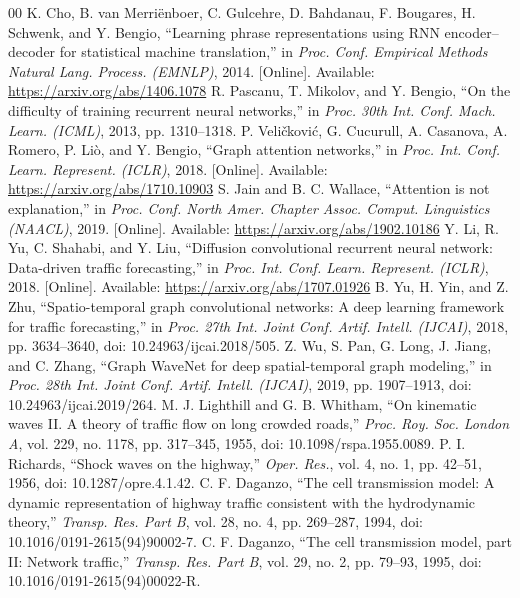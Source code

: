 \documentclass[conference]{IEEEtran}
\begin{document}
\begin{thebibliography}{00}
 K. Cho, B. van Merri\"enboer, C. Gulcehre, D. Bahdanau, F. Bougares, H. Schwenk, and Y. Bengio, ``Learning phrase representations using RNN encoder--decoder for statistical machine translation,'' in \emph{Proc. Conf. Empirical Methods Natural Lang. Process. (EMNLP)}, 2014. [Online]. Available: \url{https://arxiv.org/abs/1406.1078}
 R. Pascanu, T. Mikolov, and Y. Bengio, ``On the difficulty of training recurrent neural networks,'' in \emph{Proc. 30th Int. Conf. Mach. Learn. (ICML)}, 2013, pp. 1310--1318.
 P. Veli\v{c}kovi\'c, G. Cucurull, A. Casanova, A. Romero, P. Li\`o, and Y. Bengio, ``Graph attention networks,'' in \emph{Proc. Int. Conf. Learn. Represent. (ICLR)}, 2018. [Online]. Available: \url{https://arxiv.org/abs/1710.10903}
 S. Jain and B. C. Wallace, ``Attention is not explanation,'' in \emph{Proc. Conf. North Amer. Chapter Assoc. Comput. Linguistics (NAACL)}, 2019. [Online]. Available: \url{https://arxiv.org/abs/1902.10186}
 Y. Li, R. Yu, C. Shahabi, and Y. Liu, ``Diffusion convolutional recurrent neural network: Data-driven traffic forecasting,'' in \emph{Proc. Int. Conf. Learn. Represent. (ICLR)}, 2018. [Online]. Available: \url{https://arxiv.org/abs/1707.01926}
 B. Yu, H. Yin, and Z. Zhu, ``Spatio-temporal graph convolutional networks: A deep learning framework for traffic forecasting,'' in \emph{Proc. 27th Int. Joint Conf. Artif. Intell. (IJCAI)}, 2018, pp. 3634--3640, doi: 10.24963/ijcai.2018/505.
 Z. Wu, S. Pan, G. Long, J. Jiang, and C. Zhang, ``Graph WaveNet for deep spatial-temporal graph modeling,'' in \emph{Proc. 28th Int. Joint Conf. Artif. Intell. (IJCAI)}, 2019, pp. 1907--1913, doi: 10.24963/ijcai.2019/264.
 M. J. Lighthill and G. B. Whitham, ``On kinematic waves II. A theory of traffic flow on long crowded roads,'' \emph{Proc. Roy. Soc. London A}, vol. 229, no. 1178, pp. 317--345, 1955, doi: 10.1098/rspa.1955.0089.
 P. I. Richards, ``Shock waves on the highway,'' \emph{Oper. Res.}, vol. 4, no. 1, pp. 42--51, 1956, doi: 10.1287/opre.4.1.42.
 C. F. Daganzo, ``The cell transmission model: A dynamic representation of highway traffic consistent with the hydrodynamic theory,'' \emph{Transp. Res. Part B}, vol. 28, no. 4, pp. 269--287, 1994, doi: 10.1016/0191-2615(94)90002-7.
 C. F. Daganzo, ``The cell transmission model, part II: Network traffic,'' \emph{Transp. Res. Part B}, vol. 29, no. 2, pp. 79--93, 1995, doi: 10.1016/0191-2615(94)00022-R.

\end{thebibliography}
\end{document}
